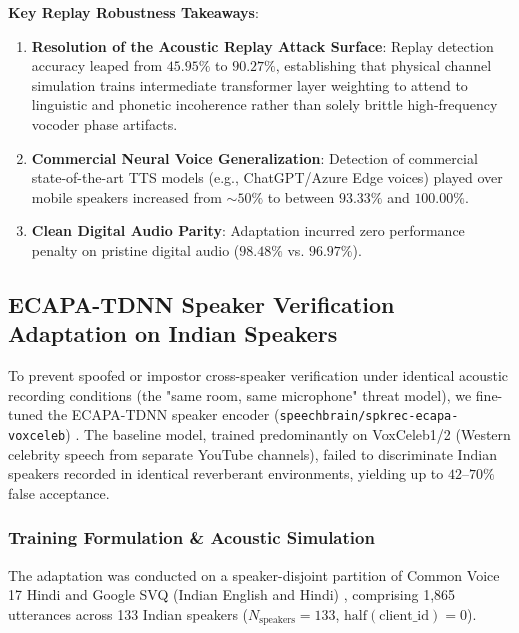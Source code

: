 \documentclass[11pt,a4paper]{article}
\begin{document}
\noindent\textbf{Key Replay Robustness Takeaways}:
\begin{enumerate}
    \item \textbf{Resolution of the Acoustic Replay Attack Surface}: Replay detection accuracy leaped from $45.95\%$ to $90.27\%$, establishing that physical channel simulation trains intermediate transformer layer weighting to attend to linguistic and phonetic incoherence rather than solely brittle high-frequency vocoder phase artifacts.
    \item \textbf{Commercial Neural Voice Generalization}: Detection of commercial state-of-the-art TTS models (e.g., ChatGPT/Azure Edge voices) played over mobile speakers increased from $\sim 50\%$ to between $93.33\%$ and $100.00\%$.
    \item \textbf{Clean Digital Audio Parity}: Adaptation incurred zero performance penalty on pristine digital audio ($98.48\%$ vs. $96.97\%$).
\end{enumerate}

\subsection{ECAPA-TDNN Speaker Verification Adaptation on Indian Speakers}
To prevent spoofed or impostor cross-speaker verification under identical acoustic recording conditions (the "same room, same microphone" threat model), we fine-tuned the ECAPA-TDNN speaker encoder (\texttt{speechbrain/spkrec-ecapa-voxceleb}) \cite{desplanques2020ecapa}. The baseline model, trained predominantly on VoxCeleb1/2 (Western celebrity speech from separate YouTube channels), failed to discriminate Indian speakers recorded in identical reverberant environments, yielding up to $42$--$70\%$ false acceptance.

\subsubsection{Training Formulation \& Acoustic Simulation}
The adaptation was conducted on a speaker-disjoint partition of Common Voice 17 Hindi \cite{ardila2020common} and Google SVQ (Indian English and Hindi) \cite{google2023svq}, comprising 1,865 utterances across 133 Indian speakers ($N_{\text{speakers}}=133$, $\text{half}(\text{client\_id}) = 0$).
\end{document}
